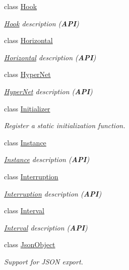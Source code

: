 \begin{DoxyCompactItemize}
class \hyperlink{classHurricane_1_1Hook}{Hook}
\begin{DoxyCompactList}\small\item\em \hyperlink{classHurricane_1_1Hook}{Hook} description ({\bfseries A\+PI}) \end{DoxyCompactList}\item 
class \hyperlink{classHurricane_1_1Horizontal}{Horizontal}
\begin{DoxyCompactList}\small\item\em \hyperlink{classHurricane_1_1Horizontal}{Horizontal} description ({\bfseries A\+PI}) \end{DoxyCompactList}\item 
class \hyperlink{classHurricane_1_1HyperNet}{Hyper\+Net}
\begin{DoxyCompactList}\small\item\em \hyperlink{classHurricane_1_1HyperNet}{Hyper\+Net} description ({\bfseries A\+PI}) \end{DoxyCompactList}\item 
class \hyperlink{classHurricane_1_1Initializer}{Initializer}
\begin{DoxyCompactList}\small\item\em Register a static initialization function. \end{DoxyCompactList}\item 
class \hyperlink{classHurricane_1_1Instance}{Instance}
\begin{DoxyCompactList}\small\item\em \hyperlink{classHurricane_1_1Instance}{Instance} description ({\bfseries A\+PI}) \end{DoxyCompactList}\item 
class \hyperlink{classHurricane_1_1Interruption}{Interruption}
\begin{DoxyCompactList}\small\item\em \hyperlink{classHurricane_1_1Interruption}{Interruption} description ({\bfseries A\+PI}) \end{DoxyCompactList}\item 
class \hyperlink{classHurricane_1_1Interval}{Interval}
\begin{DoxyCompactList}\small\item\em \hyperlink{classHurricane_1_1Interval}{Interval} description ({\bfseries A\+PI}) \end{DoxyCompactList}\item 
class \hyperlink{classHurricane_1_1JsonObject}{Json\+Object}
\begin{DoxyCompactList}\small\item\em Support for J\+S\+ON export. \end{DoxyCompactList}\item 

\end{DoxyCompactItemize}

